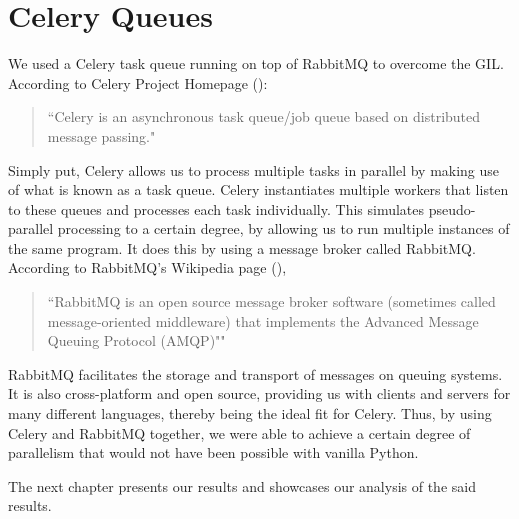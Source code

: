 \section{Celery Queues}
\label{exp:Celery}
We used a Celery task queue running on top of RabbitMQ to overcome the GIL. According to Celery Project Homepage (\cite{Celery}):
\begin{quotation}
``Celery is an asynchronous task queue/job queue based on distributed message passing."
\end{quotation}

Simply put, Celery allows us to process multiple tasks in parallel by making use of what is known as a task queue. Celery instantiates multiple workers that listen to these queues and processes each task individually. This simulates pseudo-parallel processing to a certain degree, by allowing us to run multiple instances of the same program. It does this by using a message broker called RabbitMQ.
According to RabbitMQ's Wikipedia page (\cite{wiki:RabbitMQ}),
\begin{quotation}
``RabbitMQ is an open source message broker software (sometimes called message-oriented middleware) that implements the Advanced Message Queuing Protocol (AMQP)""
\end{quotation}
RabbitMQ facilitates the storage and transport of messages on queuing systems. It is also cross-platform and open source, providing us with clients and servers for many different languages, thereby being the ideal fit for Celery.
Thus, by using Celery and RabbitMQ together, we were able to achieve a certain degree of parallelism that would not have been possible with vanilla Python.

The next chapter presents our results and showcases our analysis of the said results.
